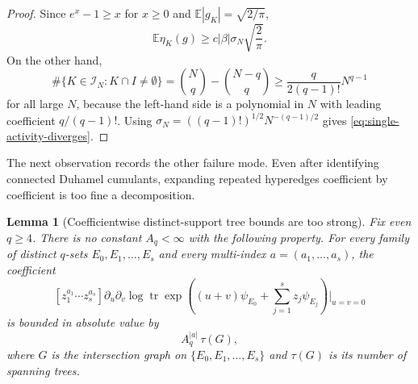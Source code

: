 \documentclass[11pt]{article}
\newtheorem{lemma}[theorem]{Lemma}
\newcommand{\E}{\mathbb{E}}
\newcommand{\tr}{\operatorname{tr}}
\newcommand{\calI}{\mathcal{I}}
\begin{document}
\begin{proof}
  Since $e^x-1\geq x$ for $x\geq0$ and $\E|g_K|=\sqrt{2/\pi}$,
  \begin{equation}\label{eq:eta-first-order}
    \E\eta_K(g)
    \geq
    c|\beta|\sigma_N\sqrt{\frac2\pi}.
  \end{equation}
  On the other hand,
  \begin{equation}\label{eq:number-touching-I}
    \#\{K\in\calI_N:K\cap I\neq\emptyset\}
    =
    \binom Nq-\binom{N-q}{q}
    \geq
    \frac{q}{2(q-1)!}N^{q-1}
  \end{equation}
  for all large $N$, because the left-hand side is a polynomial in $N$ with
  leading coefficient $q/(q-1)!$.  Using
  $\sigma_N=((q-1)!)^{1/2}N^{-(q-1)/2}$ gives
  \eqref{eq:single-activity-diverges}.
\end{proof}

The next observation records the other failure mode.  Even after identifying
connected Duhamel cumulants, expanding repeated hyperedges coefficient by
coefficient is too fine a decomposition.

\begin{lemma}[Coefficientwise distinct-support tree bounds are too strong]
  \label{lem:coefficientwise-tree-fails}
  Fix even $q\geq4$.  There is no constant $A_q<\infty$ with the following
  property.  For every family of distinct $q$-sets $E_0,E_1,\ldots,E_s$ and
  every multi-index $a=(a_1,\ldots,a_s)$, the coefficient
  \begin{equation}\label{eq:bad-coefficient-def}
    [z_1^{a_1}\cdots z_s^{a_s}]
    \partial_u\partial_v
    \log\tr\exp\left(
      (u+v)\psi_{E_0}+\sum_{j=1}^s z_j\psi_{E_j}
    \right)\bigg|_{u=v=0}
  \end{equation}
  is bounded in absolute value by
  \begin{equation}\label{eq:false-coefficientwise-bound}
    A_q^{|a|}\,\tau(G),
  \end{equation}
  where $G$ is the intersection graph on
  $\{E_0,E_1,\ldots,E_s\}$ and $\tau(G)$ is its number of spanning trees.
\end{lemma}
\end{document}
